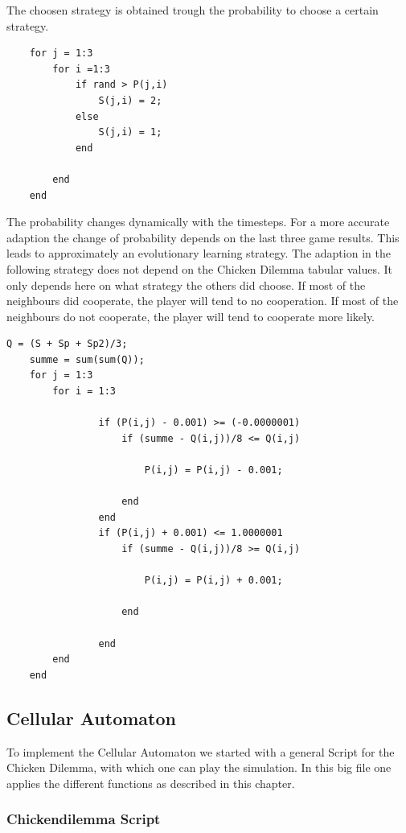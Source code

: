 \documentclass[11pt]{article}
\begin{document}
The choosen strategy is obtained trough the probability to choose a certain strategy.
\begin{verbatim}
    for j = 1:3
        for i =1:3
            if rand > P(j,i)
                S(j,i) = 2;
            else
                S(j,i) = 1;
            end
            
        end
    end
\end{verbatim}
The probability changes dynamically with the timesteps. For a more accurate adaption the change of probability depends on the last three game results. This leads to approximately an evolutionary learning strategy.
The adaption in the following strategy does not depend on the Chicken Dilemma tabular values. It only depends here on what strategy the others did choose. If most of the neighbours did cooperate, the player will tend to no cooperation. If most of the neighbours do not cooperate, the player will tend to cooperate more likely.
\begin{verbatim}
Q = (S + Sp + Sp2)/3;
    summe = sum(sum(Q));
    for j = 1:3
        for i = 1:3

                if (P(i,j) - 0.001) >= (-0.0000001)
                    if (summe - Q(i,j))/8 <= Q(i,j) 
 
                        P(i,j) = P(i,j) - 0.001;

                    end
                end
                if (P(i,j) + 0.001) <= 1.0000001 
                    if (summe - Q(i,j))/8 >= Q(i,j) 
             
                        P(i,j) = P(i,j) + 0.001;

                    end

                end
        end
    end
\end{verbatim}



\subsection{Cellular Automaton}

To implement the Cellular Automaton we started with a general Script for the Chicken Dilemma, with which one can play the simulation. In this big file one applies the different functions as described in this chapter.

\subsubsection{Chickendilemma Script}
\end{document}
